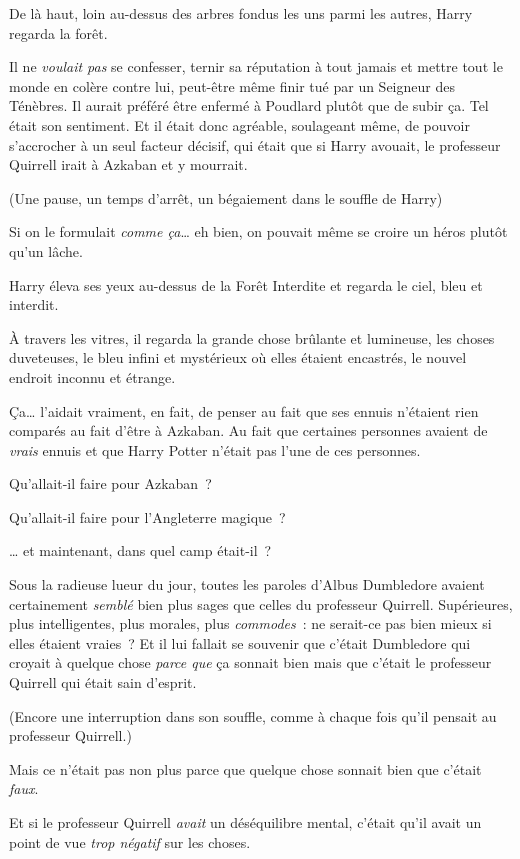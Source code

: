 De là haut, loin au-dessus des arbres fondus les uns parmi les autres, Harry regarda la forêt.

Il ne \emph{voulait pas} se confesser, ternir sa réputation à tout jamais et mettre tout le monde en colère contre lui, peut-être même finir tué par un Seigneur des Ténèbres. Il aurait préféré être enfermé à Poudlard plutôt que de subir ça. Tel était son sentiment. Et il était donc agréable, soulageant même, de pouvoir s'accrocher à un seul facteur décisif, qui était que si Harry avouait, le professeur Quirrell irait à Azkaban et y mourrait.

(Une pause, un temps d'arrêt, un bégaiement dans le souffle de Harry)

Si on le formulait \emph{comme ça}… eh bien, on pouvait même se croire un héros plutôt qu'un lâche.

Harry éleva ses yeux au-dessus de la Forêt Interdite et regarda le ciel, bleu et interdit.

À travers les vitres, il regarda la grande chose brûlante et lumineuse, les choses duveteuses, le bleu infini et mystérieux où elles étaient encastrés, le nouvel endroit inconnu et étrange.

Ça… l'aidait vraiment, en fait, de penser au fait que ses ennuis n'étaient rien comparés au fait d'être à Azkaban. Au fait que certaines personnes avaient de \emph{vrais} ennuis et que Harry Potter n'était pas l'une de ces personnes.

Qu'allait-il faire pour Azkaban~?

Qu'allait-il faire pour l'Angleterre magique~?

… et maintenant, dans quel camp était-il~?

Sous la radieuse lueur du jour, toutes les paroles d'Albus Dumbledore avaient certainement \emph{semblé} bien plus sages que celles du professeur Quirrell. Supérieures, plus intelligentes, plus morales, plus \emph{commodes}~: ne serait-ce pas bien mieux si elles étaient vraies~? Et il lui fallait se souvenir que c'était Dumbledore qui croyait à quelque chose \emph{parce que} ça sonnait bien mais que c'était le professeur Quirrell qui était sain d'esprit.

(Encore une interruption dans son souffle, comme à chaque fois qu'il pensait au professeur Quirrell.)

Mais ce n'était pas non plus parce que quelque chose sonnait bien que c'était \emph{faux}.

Et si le professeur Quirrell \emph{avait} un déséquilibre mental, c'était qu'il avait un point de vue \emph{trop négatif} sur les choses.

